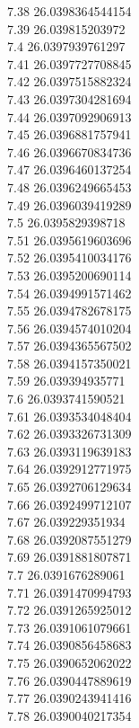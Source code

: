 {7.38	26.0398364544154\\
7.39	26.039815203972\\
7.4	26.0397939761297\\
7.41	26.0397727708845\\
7.42	26.0397515882324\\
7.43	26.0397304281694\\
7.44	26.0397092906913\\
7.45	26.0396881757941\\
7.46	26.0396670834736\\
7.47	26.0396460137254\\
7.48	26.0396249665453\\
7.49	26.0396039419289\\
7.5	26.0395829398718\\
7.51	26.0395619603696\\
7.52	26.0395410034176\\
7.53	26.0395200690114\\
7.54	26.0394991571462\\
7.55	26.0394782678175\\
7.56	26.0394574010204\\
7.57	26.0394365567502\\
7.58	26.0394157350021\\
7.59	26.039394935771\\
7.6	26.0393741590521\\
7.61	26.0393534048404\\
7.62	26.0393326731309\\
7.63	26.0393119639183\\
7.64	26.0392912771975\\
7.65	26.0392706129634\\
7.66	26.0392499712107\\
7.67	26.039229351934\\
7.68	26.0392087551279\\
7.69	26.0391881807871\\
7.7	26.0391676289061\\
7.71	26.0391470994793\\
7.72	26.0391265925012\\
7.73	26.0391061079661\\
7.74	26.0390856458683\\
7.75	26.0390652062022\\
7.76	26.0390447889619\\
7.77	26.0390243941416\\
7.78	26.0390040217354\\
}
